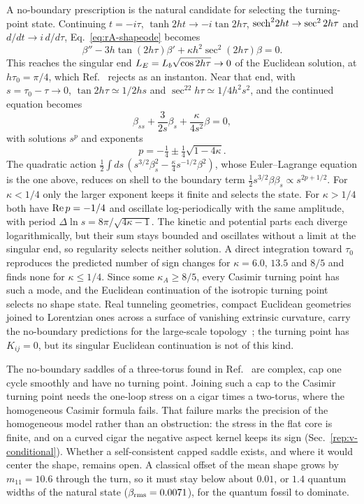 A no-boundary prescription is the natural candidate for selecting the turning-point state.
Continuing $t=-i\tau$, $\tanh2ht\to-i\tan2h\tau$, ${\rm sech}^22ht\to\sec^22h\tau$ and $d/dt\to i\,d/d\tau$, Eq.~\eqref{eq:rA-shapeode} becomes
\begin{equation}
\beta''-3h\tan(2h\tau)\beta'+\kappa h^2\sec^2(2h\tau)\beta=0 .
\end{equation}
This reaches the singular end $L_E=L_b\sqrt{\cos2h\tau}\to0$ of the Euclidean solution, at $h\tau_0=\pi/4$, which Ref.~\cite{Guth:2025dal} rejects as an instanton.
Near that end, with $s=\tau_0-\tau\to0$, $\tan2h\tau\simeq1/2hs$ and $\sec^22h\tau\simeq1/4h^2s^2$, and the continued equation becomes
\begin{equation}
\beta_{ss}+\frac{3}{2s}\beta_s+\frac{\kappa}{4s^2}\beta=0,
\end{equation}
with solutions $s^p$ and exponents
\begin{equation}
p=-\tfrac14\pm\tfrac14\sqrt{1-4\kappa}.
\end{equation}
The quadratic action $\tfrac12\int ds\,(s^{3/2}\beta_s^2-\tfrac\kappa4s^{-1/2}\beta^2)$, whose Euler--Lagrange equation is the one above, reduces on shell to the boundary term $\tfrac12s^{3/2}\beta\beta_s\propto s^{2p+1/2}$.
For $\kappa<1/4$ only the larger exponent keeps it finite and selects the state.
For $\kappa>1/4$ both have ${\rm Re}\,p=-1/4$ and oscillate log-periodically with the same amplitude, with period $\Delta\ln s=8\pi/\sqrt{4\kappa-1}$.
The kinetic and potential parts each diverge logarithmically, but their sum stays bounded and oscillates without a limit at the singular end, so regularity selects neither solution.
A direct integration toward $\tau_0$ reproduces the predicted number of sign changes for $\kappa=6.0$, $13.5$ and $8/5$ and finds none for $\kappa\leq1/4$. %
Since some $\kappa_A\geq8/5$, every Casimir turning point has such a mode, and the Euclidean continuation of the isotropic turning point selects no shape state.
Real tunneling geometries, compact Euclidean geometries joined to Lorentzian ones across a surface of vanishing extrinsic curvature, carry the no-boundary predictions for the large-scale topology~\cite{Gibbons:1990ns}; the turning point has $K_{ij}=0$, but its singular Euclidean continuation is not of this kind.

The no-boundary saddles of a three-torus found in Ref.~\cite{Godet:2026gqw} are complex, cap one cycle smoothly and have no turning point.
Joining such a cap to the Casimir turning point needs the one-loop stress on a cigar times a two-torus, where the homogeneous Casimir formula fails.
That failure marks the precision of the homogeneous model rather than an obstruction: the stress in the flat core is finite, and on a curved cigar the negative aspect kernel keeps its sign (Sec.~\ref{rep:v-conditional}).
Whether a self-consistent capped saddle exists, and where it would center the shape, remains open.
A classical offset of the mean shape grows by $m_{11}=10.6$ through the turn, so it must stay below about $0.01$, or $1.4$ quantum widths of the natural state ($\beta_{\rm rms}=0.0071$), for the quantum fossil to dominate. %
